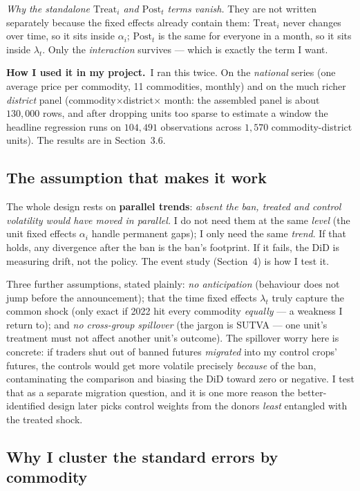 \documentclass[11pt]{article}
\newcommand{\applied}{\smallskip\noindent\textbf{How I used it in my project.}\ }
\begin{document}
\smallskip\noindent\emph{Why the standalone $\mathrm{Treat}_i$ and $\mathrm{Post}_t$ terms vanish.}
They are not written separately because the fixed effects already contain them: $\mathrm{Treat}_i$
never changes over time, so it sits inside $\alpha_i$; $\mathrm{Post}_t$ is the same for everyone in
a month, so it sits inside $\lambda_t$. Only the \emph{interaction} survives --- which is exactly
the term I want.

\applied I ran this twice. On the \emph{national} series (one average price per commodity, 11
commodities, monthly) and on the much richer \emph{district} panel (commodity$\times$district$\times$
month: the assembled panel is about $130{,}000$ rows, and after dropping units too sparse to
estimate a window the headline regression runs on $104{,}491$ observations across $1{,}570$
commodity-district units). The results are in Section~3.6.

\subsection{The assumption that makes it work}

The whole design rests on \textbf{parallel trends}: \emph{absent the ban, treated and control
volatility would have moved in parallel.} I do not need them at the same \emph{level} (the unit
fixed effects $\alpha_i$ handle permanent gaps); I only need the same \emph{trend}. If that holds,
any divergence after the ban is the ban's footprint. If it fails, the DiD is measuring drift, not
the policy. The event study (Section~4) is how I test it.

Three further assumptions, stated plainly: \emph{no anticipation} (behaviour does not jump before
the announcement); that the time fixed effects $\lambda_t$ truly capture the common shock (only
exact if 2022 hit every commodity \emph{equally} --- a weakness I return to); and \emph{no
cross-group spillover} (the jargon is SUTVA --- one unit's treatment must not affect another
unit's outcome). The spillover worry here is concrete: if traders shut out of banned futures
\emph{migrated} into my control crops' futures, the controls would get more volatile precisely
\emph{because} of the ban, contaminating the comparison and biasing the DiD toward zero or negative.
I test that as a separate migration question, and it is one more reason the better-identified design
later picks control weights from the donors \emph{least} entangled with the treated shock.

\subsection{Why I cluster the standard errors by commodity}
\end{document}
